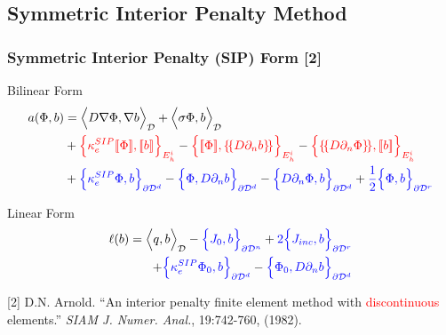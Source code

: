 \documentclass[compress,10pt]{beamer}
\renewcommand{\vec}[1]{\mathbf{#1}}
\newcommand{\tcr}[1]{\textcolor{red}{#1}}
\newcommand{\tcb}[1]{\textcolor{blue}{#1}}
\begin{document}
\subsection{Symmetric Interior Penalty Method}
\begin{frame}[t]\frametitle{Symmetric Interior Penalty (SIP) Form [2]}
\begin{block}{Bilinear Form}{\small
\begin{equation*}
\begin{aligned}
a( \Phi, b)  &= \Big<  D \vec{\nabla}  \Phi , \vec{\nabla} b  \Big>_{\mathcal{D}} + \Big<  \sigma   \Phi ,  b  \Big>_{\mathcal{D}}    \\
&+  \tcr{\Big\{ \kappa_e^{SIP} [\![   \Phi ]\!] , [\![  b ]\!]\Big\}_{E_h^i}} - \tcr{\Big\{  [\![   \Phi ]\!] , \{\!\{  D \partial_n b \}\!\}\Big\}_{E_h^i}} -\tcr{\Big\{ \{\!\{  D \partial_n  \Phi \}\!\} , [\![ b ]\!]\Big\}_{E_h^i}} \\
&+ \tcb{\Big\{ \kappa_e^{SIP}   \Phi ,   b \Big\}_{\partial \mathcal{D}^d}} - \tcb{\Big\{   \Phi  ,  D \partial_n b \Big\}_{\partial \mathcal{D}^d}} - \tcb{\Big\{   D \partial_n  \Phi ,   b \Big\}_{\partial \mathcal{D}^d}}  +  \tcb{\frac{1}{2} \Big\{    \Phi ,   b \Big\}_{\partial \mathcal{D}^r}}
\end{aligned}
\end{equation*} }
\end{block}
\begin{block}{Linear Form}{\small
\begin{align*}
\ell (b) = \Big<  q, b  \Big>_{\mathcal{D}}  - \tcb{\Big\{   J_{0}, b  \Big\}_{\partial \mathcal{D}^n}} +  \tcb{2 \Big\{   J_{inc}, b  \Big\}_{\partial \mathcal{D}^r}} \\ + \tcb{\Big\{ \kappa_e^{SIP}   \Phi_0 ,   b \Big\}_{\partial \mathcal{D}^d}} - \tcb{\Big\{   \Phi_0  ,  D \partial_n b \Big\}_{\partial \mathcal{D}^d} }
\end{align*} }
\end{block}
\begin{block}{}{\footnotesize
[2] D.N. Arnold. ``An interior penalty finite element method with \tcr{discontinuous} elements.'' {\em SIAM J. Numer. Anal.}, 19:742-760, (1982).
}\end{block}
\end{frame}
\end{document}
